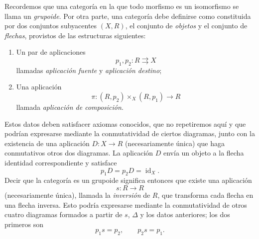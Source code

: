 \documentclass[11pt,twoside,openany]{book}
\numberwithin{equation}{section}
\newcommand{\src}[1]{%
  \phantomsection\hypertarget{src:#1}{}%
  \marginpar{\raggedleft\footnotesize\sffamily #1}%
}
\theoremstyle{plain}
\theoremstyle{definition}
\theoremstyle{remark}
\newcommand{\FgaUnitKey}{frontmatter}
\renewcommand{\src}[1]{%
  \phantomsection\hypertarget{src:\FgaUnitKey:#1}{}%
  \marginpar{\raggedleft\footnotesize\sffamily #1}%
}
\theoremstyle{plain}
\theoremstyle{definition}
\theoremstyle{remark}
\begin{document}
Recordemos que una categoría en la que todo morfismo es un isomorfismo se
llama un \emph{grupoide}. Por otra parte, una categoría debe definirse como
constituida por dos conjuntos subyacentes $(X,R)$, el conjunto de
\emph{objetos} y el conjunto de \emph{flechas}, provistos de las estructuras
siguientes:
\src{106}
\begin{enumerate}
\item[(i)] Un par de aplicaciones
\[
  p_1,p_2:R\rightrightarrows X
\]
llamadas \emph{aplicación fuente} y \emph{aplicación destino};

\item[(ii)] Una aplicación
\[
  \pi:(R,p_2)\times_X(R,p_1)\longrightarrow R
\]
llamada \emph{aplicación de composición}.
\end{enumerate}
Estos datos deben satisfacer axiomas conocidos, que no repetiremos aquí y que
podrían expresarse mediante la conmutatividad de ciertos diagramas, junto con
la existencia de una aplicación $D:X\to R$ (necesariamente única) que haga
conmutativos otros dos diagramas. La aplicación $D$ envía un objeto a la
flecha identidad correspondiente y satisface
\[
  p_1D=p_2D=\operatorname{id}_X.
\]
Decir que la categoría es un grupoide significa entonces que existe una
aplicación
\[
  s:R\longrightarrow R
\]
(necesariamente única), llamada la \emph{inversión} de $R$, que transforma
cada flecha en una flecha inversa. Esto podría expresarse mediante la
conmutatividad de otros cuatro diagramas formados a partir de $s$, $\Delta$ y
los datos anteriores; los dos primeros son
\[
  p_1s=p_2,\qquad p_2s=p_1.
\]
\end{document}
